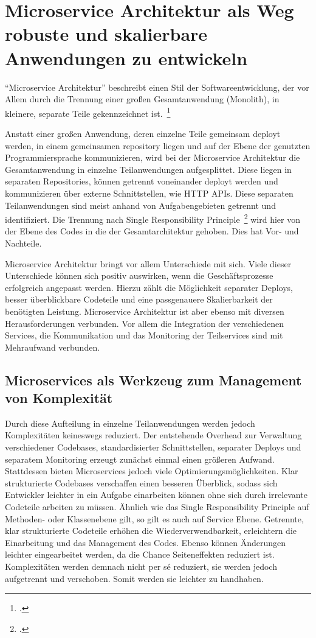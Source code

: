 \chapter{Microservice Architektur als Weg robuste und skalierbare Anwendungen zu entwickeln}
``Microservice Architektur'' beschreibt einen Stil der Softwareentwicklung, der vor Allem durch die Trennung einer großen Gesamtanwendung (Monolith), in kleinere, separate Teile gekennzeichnet ist.~\footcite[vgl.][Seite 2]{newman2015building}

Anstatt einer großen Anwendung, deren einzelne Teile gemeinsam deployt werden, in einem gemeinsamen repository liegen und auf der Ebene der genutzten Programmiersprache kommunizieren, wird bei der Microservice Architektur die Gesamtanwendung in einzelne Teilanwendungen aufgesplittet. Diese liegen in separaten Repositories, können getrennt voneinander deployt werden und kommunizieren über externe Schnittstellen, wie HTTP APIs. Diese separaten Teilanwendungen sind meist anhand von Aufgabengebieten getrennt und identifiziert. Die Trennung nach Single Responsibility Principle~\footcite{wiki:srp} wird hier von der Ebene des Codes in die der Gesamtarchitektur gehoben. Dies hat Vor- und Nachteile.

Microservice Architektur bringt vor allem Unterschiede mit sich. Viele dieser Unterschiede können sich positiv auswirken, wenn die Geschäftsprozesse erfolgreich angepasst werden. Hierzu zählt die Möglichkeit separater Deploys, besser überblickbare Codeteile und eine passgenauere Skalierbarkeit der benötigten Leistung. Microservice Architektur ist aber ebenso mit diversen Herausforderungen verbunden. Vor allem die Integration der verschiedenen Services, die Kommunikation und das Monitoring der Teilservices sind mit Mehraufwand verbunden.

\section{Microservices als Werkzeug zum Management von Komplexität}
Durch diese Aufteilung in einzelne Teilanwendungen werden jedoch Komplexitäten keineswegs reduziert. Der entstehende Overhead zur Verwaltung verschiedener Codebases, standardisierter Schnittstellen, separater Deploys und separatem Monitoring erzeugt zunächst einmal einen größeren Aufwand. Stattdessen bieten Microservices jedoch viele Optimierungsmöglichkeiten. Klar strukturierte Codebases verschaffen einen besseren Überblick, sodass sich Entwickler leichter in ein Aufgabe einarbeiten können ohne sich durch irrelevante Codeteile arbeiten zu müssen. Ähnlich wie das Single Responsibility Principle auf Methoden- oder Klassenebene gilt, so gilt es auch auf Service Ebene. Getrennte, klar strukturierte Codeteile erhöhen die Wiederverwendbarkeit, erleichtern die Einarbeitung und das Management des Codes. Ebenso können Änderungen leichter eingearbeitet werden, da die Chance Seiteneffekten reduziert ist. Komplexitäten werden demnach nicht per sé reduziert, sie werden jedoch aufgetrennt und verschoben. Somit werden sie leichter zu handhaben.

